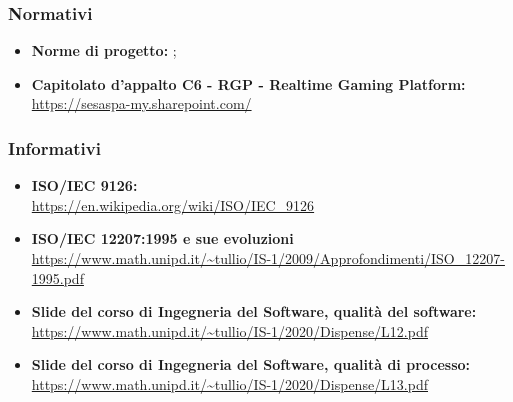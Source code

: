 		\subsubsection{Normativi}
		\begin{itemize}
			\item \textbf{Norme di progetto:} ;
			\item \textbf{Capitolato d’appalto C6 - RGP - Realtime Gaming Platform:}\\
			\href{https://sesaspa-my.sharepoint.com/personal/s_dindo_vargroup_it/_layouts/15/onedrive.aspx?id=\%2Fpersonal\%2Fs\%5Fdindo\%5Fvargroup\%5Fit\%2FDocuments\%2FDownload\%2Fupload\%2FIngegneria\%5Fsoftware\%2FCapitolato\%5FIngegneria\%5Fsoftware\%2Epdf\&parent=\%2Fpersonal\%2Fs\%5Fdindo\%5Fvargroup\%5Fit\%2FDocuments\%2FDownload\%2Fupload\%2FIngegneria\%5Fsoftware\&originalPath=aHR0cHM6Ly9zZXNhc3BhLW15LnNoYXJlcG9pbnQuY29tLzpiOi9nL3BlcnNvbmFsL3NfZGluZG9fdmFyZ3JvdXBfaXQvRVRodmF5MGY2S1ZDb1h5ZFlPY2UybGtCdC1NWWNuVzF5YWZSWEZYVklPSXNIZz9ydGltZT1jQjNzY3NxczJFZw}{https://sesaspa-my.sharepoint.com/}
		\end{itemize}
		\subsubsection{Informativi}
		\begin{itemize}
			\item \textbf{ISO/IEC 9126:}\\
			\url{https://en.wikipedia.org/wiki/ISO/IEC_9126}
			
			\item \textbf{ISO/IEC 12207:1995 e sue evoluzioni}\\
			\url{https://www.math.unipd.it/~tullio/IS-1/2009/Approfondimenti/ISO_12207-1995.pdf}
			
			\item \textbf{Slide del corso di Ingegneria del Software, qualità del software:}\\
			\url{https://www.math.unipd.it/~tullio/IS-1/2020/Dispense/L12.pdf}
			
			\item \textbf{Slide del corso di Ingegneria del Software, qualità di processo:}\\
			\url{https://www.math.unipd.it/~tullio/IS-1/2020/Dispense/L13.pdf}
		
		\end{itemize}
	